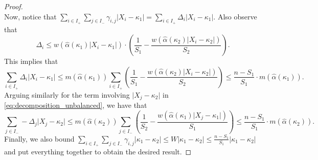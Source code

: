 \documentclass{article}
\theoremstyle{plain}
\theoremstyle{definition}
\begin{document}
\begin{appendix}
\begin{proof}
\begin{equation}
\end{equation}  
Now, notice that \( \sum_{i \in  I_+}\sum_{j \in I_-}\gamma_{i,j} \lvert X_i -\kappa _1 \rvert= \sum_{i \in I_+} \Delta_i \lvert X_i -\kappa_1 \rvert   \). Also observe that
\[
  \Delta_i \le  w(\widehat{\alpha }(\kappa_1) \lvert X_i -\kappa_1 \rvert  ) \cdot \left(\frac{1}{S_1}-\frac{w(\widehat{\alpha }(\kappa_2) \lvert X_i - \kappa _2 \rvert )}{S_2}\right).
\]
This implies that
\[
  \sum_{i \in I_+} \Delta_i \lvert X_i -\kappa _1 \rvert \le m(\widehat{\alpha }(\kappa _1)  ) \sum_{i \in I_+} \left(\frac{1}{S_1}-\frac{w(\widehat{\alpha }(\kappa_2) \lvert X_i -\kappa _2 \rvert  )}{S_2}\right) \le \frac{n-S_1}{S_1} \cdot m(\widehat{\alpha }(\kappa_1)   ).
\]
Arguing similarly for the term involving \( \lvert X_j -\kappa _2 \rvert  \) in \eqref{eq:decomposition_unbalanced}, we have that
\[
  \sum_{j \in I_-} -\Delta_j \lvert X_j -\kappa _2 \rvert \le m(\widehat{\alpha }(\kappa _2)  ) \sum_{j \in I_-} \left(\frac{1}{S_2}-\frac{w(\widehat{\alpha }(\kappa _1)\lvert X_j-\kappa _1 \rvert  )}{S_1}\right) \le \frac{n-S_1}{S_1} \cdot m(\widehat{\alpha }(\kappa_2)   ).
\] 
Finally, we also bound \( \sum_{i \in I_+}\sum_{j \in I_-} \gamma_{i,j} \lvert \kappa _1 - \kappa _2 \rvert \le W \lvert \kappa _1 - \kappa _2 \rvert \le \frac{n-S_1}{S_1}\lvert \kappa _1 -\kappa _2 \rvert  \) and put everything together to obtain the desired result.
\end{proof}


\end{appendix}
\end{document}
